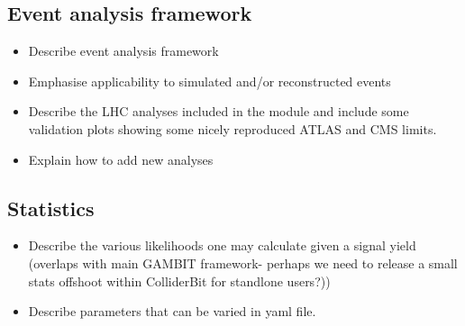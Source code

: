 \subsection{Event analysis framework}

\begin{itemize}
\item Describe event analysis framework
\item Emphasise applicability to simulated and/or reconstructed events
\item Describe the LHC analyses included in the module and include some validation plots showing some nicely reproduced ATLAS and CMS limits.
\item Explain how to add new analyses
\end{itemize}

\subsection{Statistics}

\begin{itemize}
\item Describe the various likelihoods one may calculate given a signal yield (overlaps with main GAMBIT framework- perhaps we need to release a small stats offshoot within ColliderBit for standlone users?))
\item Describe parameters that can be varied in yaml file.
\end{itemize}
